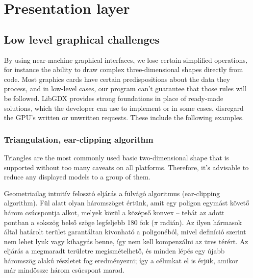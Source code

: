 \chapter{Presentation layer}

\section{Low level graphical challenges}

By using near-machine graphical interfaces, we lose certain simplified operations, for instance the ability to draw complex three-dimensional shapes directly from code. Most graphics cards have certain predispositions about the data they process, and in low-level cases, our program can't guarantee that those rules will be followed. LibGDX provides strong foundations in place of ready-made solutions, which the developer can use to implement or in some cases, disregard the GPU's written or unwritten requests. These include the following examples.

\subsection{Triangulation, ear-clipping algorithm}

Triangles are the most commonly used basic two-dimensional shape that is supported without too many caveats on all platforms. Therefore, it's advisable to reduce any displayed models to a group of them.

Geometriailag intuitív felosztó eljárás a fülvágó algoritmus (ear-clipping algorithm). Fül alatt olyan háromszöget értünk, amit egy poligon egymást követő három csúcspontja alkot, melyek közül a középső konvex -- tehát az adott pontban a sokszög belső szöge legfeljebb 180 fok ($\pi$ radián).\cite{TriangulationByEarClipping} Az ilyen hármasok által határolt terület garantáltan kivonható a poligonéból, mivel definíció szerint nem lehet lyuk vagy kihagyás benne, így nem kell kompenzálni az üres térért. Az eljárás a megmaradt területre megismételhető, és minden lépés egy újabb háromszög alakú részletet fog eredményezni; így a célunkat el is érjük, amikor már mindössze három csúcspont marad.

